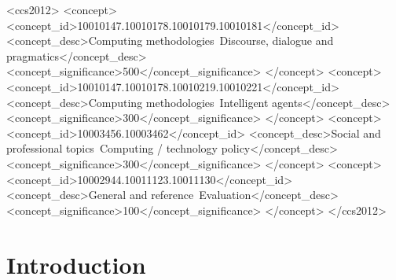 \begin{CCSXML}
<ccs2012>
   <concept>
       <concept_id>10010147.10010178.10010179.10010181</concept_id>
       <concept_desc>Computing methodologies~Discourse, dialogue and pragmatics</concept_desc>
       <concept_significance>500</concept_significance>
   </concept>
   <concept>
       <concept_id>10010147.10010178.10010219.10010221</concept_id>
       <concept_desc>Computing methodologies~Intelligent agents</concept_desc>
       <concept_significance>300</concept_significance>
   </concept>
   <concept>
       <concept_id>10003456.10003462</concept_id>
       <concept_desc>Social and professional topics~Computing / technology policy</concept_desc>
       <concept_significance>300</concept_significance>
   </concept>
   <concept>
       <concept_id>10002944.10011123.10011130</concept_id>
       <concept_desc>General and reference~Evaluation</concept_desc>
       <concept_significance>100</concept_significance>
   </concept>
</ccs2012>
\end{CCSXML}



\makeatletter
\g@addto@macro{}
\makeatother

\maketitle

\section{Introduction}\label{sec:intro}

